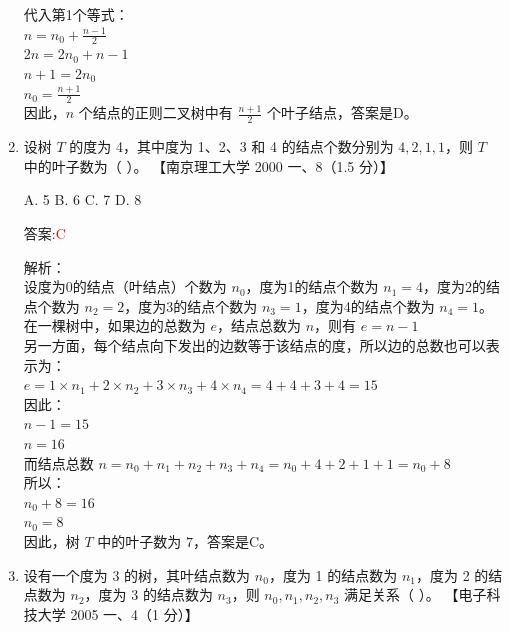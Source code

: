 \documentclass[lang=cn,newtx,10pt,scheme=chinese]{../../../elegantbook}
\begin{document}
\begin{enumerate}
    代入第1个等式：\\
    $n = n_0 + \frac{n - 1}{2}$\\
    $2n = 2n_0 + n - 1$\\
    $n + 1 = 2n_0$\\
    $n_0 = \frac{n + 1}{2}$\\
    
    因此，$n$ 个结点的正则二叉树中有 $\frac{n + 1}{2}$ 个叶子结点，答案是D。\\  

    \item 设树 $T$ 的度为 4，其中度为 1、2、3 和 4 的结点个数分别为 $4, 2, 1, 1$，则 $T$ 中的叶子数为（ ）。  
    【南京理工大学 2000 一、8（1.5 分）】  

    A. 5 \quad B. 6 \quad C. 7 \quad D. 8  
    
    答案:\textcolor{red}{C}
    
    解析：\\
    设度为0的结点（叶结点）个数为 $n_0$，度为1的结点个数为 $n_1 = 4$，度为2的结点个数为 $n_2 = 2$，度为3的结点个数为 $n_3 = 1$，度为4的结点个数为 $n_4 = 1$。\\
    
    在一棵树中，如果边的总数为 $e$，结点总数为 $n$，则有 $e = n - 1$\\
    
    另一方面，每个结点向下发出的边数等于该结点的度，所以边的总数也可以表示为：\\
    $e = 1 \times n_1 + 2 \times n_2 + 3 \times n_3 + 4 \times n_4 = 4 + 4 + 3 + 4 = 15$\\
    
    因此：\\
    $n - 1 = 15$\\
    $n = 16$\\
    
    而结点总数 $n = n_0 + n_1 + n_2 + n_3 + n_4 = n_0 + 4 + 2 + 1 + 1 = n_0 + 8$\\
    
    所以：\\
    $n_0 + 8 = 16$\\
    $n_0 = 8$\\
    
    因此，树 $T$ 中的叶子数为 $7$，答案是C。\\  

    \item 设有一个度为 3 的树，其叶结点数为 $n_0$，度为 1 的结点数为 $n_1$，度为 2 的结点数为 $n_2$，度为 3 的结点数为 $n_3$，则 $n_0, n_1, n_2, n_3$ 满足关系（ ）。  
    【电子科技大学 2005 一、4（1 分）】  


\end{enumerate}
\end{document}
